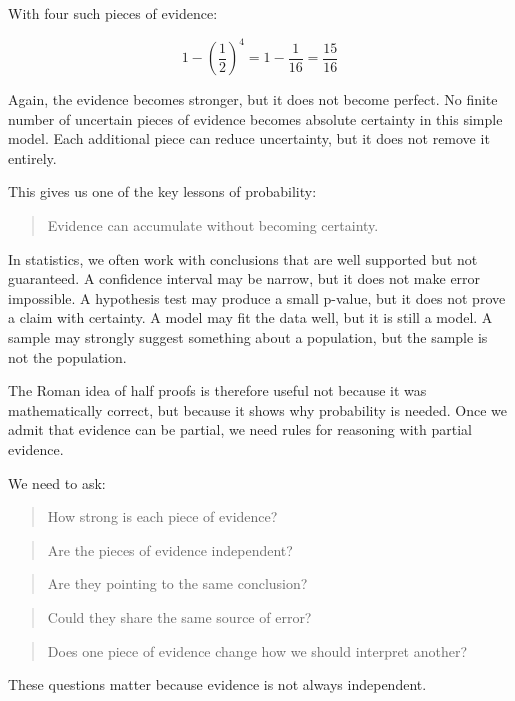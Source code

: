 \documentclass[
  letterpaper,
  DIV=11,
  numbers=noendperiod]{scrreprt}
\begin{document}
With four such pieces of evidence:

\[1 - \left(\frac{1}{2}\right)^4 = 1 - \frac{1}{16} = \frac{15}{16}\]

Again, the evidence becomes stronger, but it does not become perfect. No
finite number of uncertain pieces of evidence becomes absolute certainty
in this simple model. Each additional piece can reduce uncertainty, but
it does not remove it entirely.

This gives us one of the key lessons of probability:

\begin{quote}
Evidence can accumulate without becoming certainty.
\end{quote}

In statistics, we often work with conclusions that are well supported
but not guaranteed. A confidence interval may be narrow, but it does not
make error impossible. A hypothesis test may produce a small p-value,
but it does not prove a claim with certainty. A model may fit the data
well, but it is still a model. A sample may strongly suggest something
about a population, but the sample is not the population.

The Roman idea of half proofs is therefore useful not because it was
mathematically correct, but because it shows why probability is needed.
Once we admit that evidence can be partial, we need rules for reasoning
with partial evidence.

We need to ask:

\begin{quote}
How strong is each piece of evidence?
\end{quote}

\begin{quote}
Are the pieces of evidence independent?
\end{quote}

\begin{quote}
Are they pointing to the same conclusion?
\end{quote}

\begin{quote}
Could they share the same source of error?
\end{quote}

\begin{quote}
Does one piece of evidence change how we should interpret another?
\end{quote}

These questions matter because evidence is not always independent.
\end{document}
